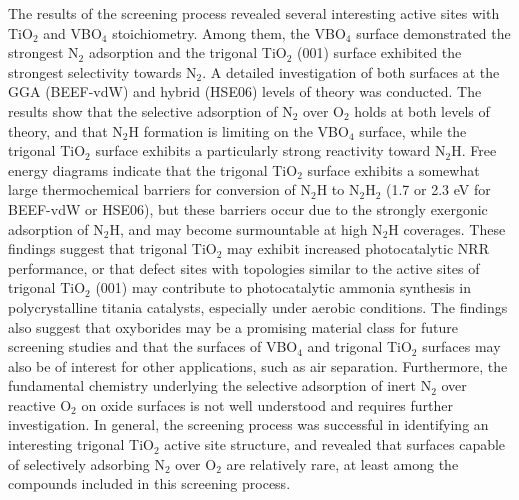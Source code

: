 The results of the screening process revealed several interesting active sites with TiO$_2$ and VBO$_4$ stoichiometry. Among them, the VBO$_4$ surface demonstrated the strongest N$_2$ adsorption and the trigonal TiO$_2$ (001) surface exhibited the strongest selectivity towards N$_2$. A detailed investigation of both surfaces at the GGA (BEEF-vdW) and hybrid (HSE06) levels of theory was conducted. The results show that the selective adsorption of N$_2$ over O$_2$ holds at both levels of theory, and that N$_2$H formation is limiting on the VBO$_4$ surface, while the trigonal TiO$_2$ surface exhibits a particularly strong reactivity toward N$_2$H. Free energy diagrams indicate that the trigonal TiO$_2$ surface exhibits a somewhat large thermochemical barriers for conversion of N$_2$H to N$_2$H$_2$ (1.7 or 2.3 eV for BEEF-vdW or HSE06), but these barriers occur due to the strongly exergonic adsorption of N$_2$H, and may become surmountable at high N$_2$H coverages. These findings suggest that trigonal TiO$_2$ may exhibit increased photocatalytic NRR performance, or that defect sites with topologies similar to the active sites of trigonal TiO$_2$ (001) may contribute to photocatalytic ammonia synthesis in polycrystalline titania catalysts, especially under aerobic conditions. The findings also suggest that oxyborides may be a promising material class for future screening studies and that the surfaces of VBO$_4$ and trigonal TiO$_2$ surfaces may also be of interest for other applications, such as air separation. Furthermore, the fundamental chemistry underlying the selective adsorption of inert N$_2$ over reactive O$_2$ on oxide surfaces is not well understood and requires further investigation. In general, the screening process was successful in identifying an interesting trigonal TiO$_2$ active site structure, and revealed that surfaces capable of selectively adsorbing N$_2$ over O$_2$ are relatively rare, at least among the compounds included in this screening process.

